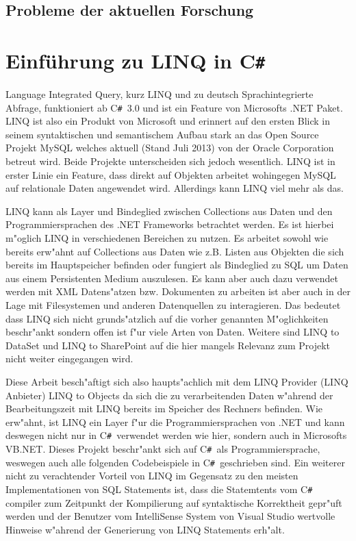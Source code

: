 \documentclass[pagesize, paper=a4, fontsize=12pt,titlepage=true, headings=small, headnosepline, abstractoff, liststotoc, nochapterprefix, plainheadsepline]{scrreprt}
\newcommand{\CS}{C\texttt{\#}}
\newcommand{\CSS}{C\texttt{\# }}
\begin{document}
		\subsection {Probleme der aktuellen Forschung}
	\section {Einführung zu LINQ in \CS}
		Language Integrated Query, kurz LINQ und zu deutsch Sprachintegrierte Abfrage, funktioniert ab \CSS 3.0 und ist ein Feature von Microsofts .NET Paket. LINQ ist also ein Produkt von Microsoft und erinnert auf den ersten Blick in seinem syntaktischen und semantischem Aufbau stark an das Open Source Projekt MySQL welches aktuell (Stand Juli 2013) von der Oracle Corporation betreut wird. Beide Projekte unterscheiden sich jedoch wesentlich. LINQ ist in erster Linie ein Feature, dass direkt auf Objekten arbeitet wohingegen MySQL auf relationale Daten angewendet wird. Allerdings kann LINQ viel mehr als das.

LINQ kann als Layer und Bindeglied zwischen Collections aus Daten und den Programmiersprachen des .NET Frameworks betrachtet werden. Es ist hierbei m"oglich LINQ in verschiedenen Bereichen zu nutzen. Es arbeitet sowohl wie bereits erw"ahnt auf Collections aus Daten wie z.B. Listen aus Objekten die sich bereits im Hauptspeicher befinden oder fungiert als Bindeglied zu SQL um Daten aus einem Persistenten Medium auszulesen. Es kann aber auch dazu verwendet werden mit XML Datens"atzen bzw. Dokumenten zu arbeiten ist aber auch in der Lage mit Filesystemen und anderen Datenquellen zu interagieren. Das bedeutet dass LINQ sich nicht grunds"atzlich auf die vorher genannten M"oglichkeiten beschr"ankt sondern offen ist f"ur viele Arten von Daten. Weitere sind LINQ to DataSet und LINQ to SharePoint auf die hier mangels Relevanz zum Projekt nicht weiter eingegangen wird.

Diese Arbeit besch"aftigt sich also haupts"achlich mit dem LINQ Provider (LINQ Anbieter) LINQ to Objects da sich die zu verarbeitenden Daten w"ahrend der Bearbeitungszeit mit LINQ bereits im Speicher des Rechners befinden. Wie erw"ahnt, ist LINQ ein Layer f"ur die Programmiersprachen von .NET und kann deswegen nicht nur in \CSS verwendet werden wie hier, sondern auch in Microsofts VB.NET. Dieses Projekt beschr"ankt sich auf \CSS als Programmiersprache, weswegen auch alle folgenden Codebeispiele in \CSS geschrieben sind. Ein weiterer nicht zu verachtender Vorteil von LINQ im Gegensatz zu den meisten Implementationen von SQL Statements ist, dass die Statemtents vom \CSS compiler zum Zeitpunkt der Kompilierung auf syntaktische Korrektheit gepr"uft werden und der Benutzer vom IntelliSense System von Visual Studio wertvolle Hinweise w"ahrend der Generierung von LINQ Statements erh"alt.
\end{document}
